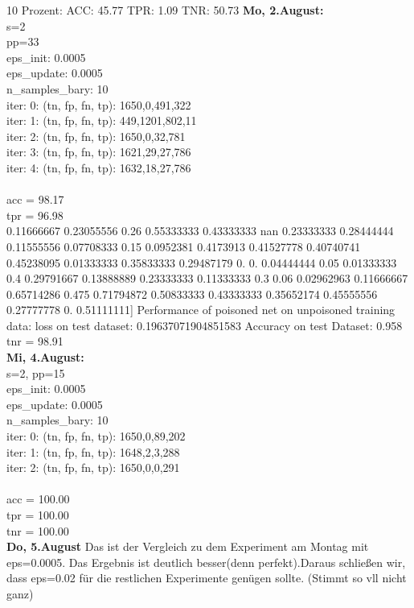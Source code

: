 \documentclass[twoside, 11pt,a4paper]{article}
\numberwithin{equation}{section}
\begin{document}
	10 Prozent: ACC: 45.77
	TPR:  1.09
	TNR:  50.73
	\newpage
	\noindent \textbf{Mo, 2.August:}\\
	s=2\\
	pp=33\\
	eps\_init: 0.0005\\
	eps\_update: 0.0005\\
	n\_samples\_bary: 10\\
	iter: 0:	(tn, fp, fn, tp): 1650,0,491,322\\
	iter: 1:	(tn, fp, fn, tp): 449,1201,802,11\\
	iter: 2:	(tn, fp, fn, tp): 1650,0,32,781\\
	iter: 3:	(tn, fp, fn, tp): 1621,29,27,786\\
	iter: 4:	(tn, fp, fn, tp): 1632,18,27,786\\
	\\
	acc = 98.17\\
	tpr = 96.98\\0.11666667 0.23055556 0.26       0.55333333 0.43333333        nan
	0.23333333 0.28444444 0.11555556 0.07708333 0.15       0.0952381
	0.4173913  0.41527778 0.40740741 0.45238095 0.01333333 0.35833333
	0.29487179 0.         0.         0.04444444 0.05       0.01333333
	0.4        0.29791667 0.13888889 0.23333333 0.11333333 0.3
	0.06       0.02962963 0.11666667 0.65714286 0.475      0.71794872
	0.50833333 0.43333333 0.35652174 0.45555556 0.27777778 0.
	0.51111111]
	Performance of poisoned net on unpoisoned training data:
	loss on test dataset: 0.19637071904851583
	Accuracy on test Dataset: 0.958 
	tnr = 98.91\\
	
	
	
	\noindent \textbf{Mi, 4.August:}\\
	s=2, pp=15\\
	eps\_init: 0.0005\\
	eps\_update: 0.0005\\
	n\_samples\_bary: 10\\
	iter: 0:	(tn, fp, fn, tp): 1650,0,89,202\\
	iter: 1:	(tn, fp, fn, tp): 1648,2,3,288\\
	iter: 2:	(tn, fp, fn, tp): 1650,0,0,291\\
	\\
	acc = 100.00\\
	tpr = 100.00\\
	tnr = 100.00\\
	
	\noindent \textbf{Do, 5.August}
	Das ist der Vergleich zu dem Experiment am Montag mit eps=0.0005. Das Ergebnis ist deutlich besser(denn perfekt).Daraus schließen wir, dass eps=0.02 für die restlichen Experimente genügen sollte. (Stimmt so vll nicht ganz)
	
\end{document}
